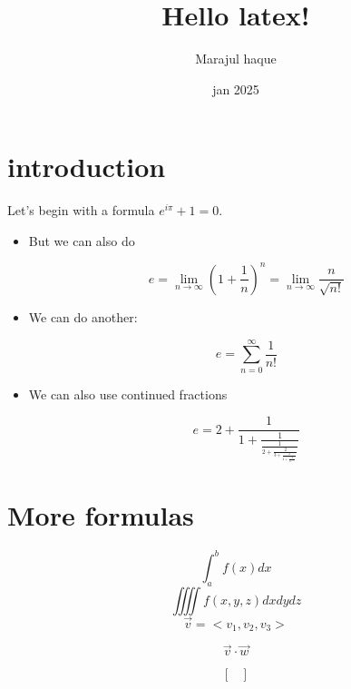 \documentclass{article}
\title{Hello latex!}
\author{Marajul haque}
\date{jan 2025}
\begin{document}
	
	\maketitle
	
	\section*{introduction}
	
	Let's begin with a formula $e^{i\pi}+1=0$. 
	
	
	
	\begin{itemize}
		
		
		
		\item  But we can also do 
		
		$$  e=\lim_{n\to\infty}  \left(1+\frac{1}{n}\right)^n = \lim_{n\to\infty}\frac{n}{\sqrt{n!}}$$
		
		\item We can do another:
		
		$$ e=\sum_{n=0}^{\infty} \frac{1}{n!} $$
		
		
		\item We can also use continued fractions
		
		$$ e=2+\frac{1}{1+\frac{1}{\frac{1}{2+\frac{2}{3+\frac{3}{4+\frac{4}{5+\ddots}}}}}}$$
		
	\end{itemize}
	
	\section{More formulas}
	
	
	$$\int_a^bf(x)dx$$
	$$  \iiiint f(x,y,z)dxdydz	$$
	$$\vec{v}=<v_1, v_2, v_3>  $$
	
	$$\vec{v}\cdot\vec{w}$$
	
	$$\begin{bmatrix}
		
		
		
	\end{bmatrix}
	$$	
	
	
	
	
\end{document}
